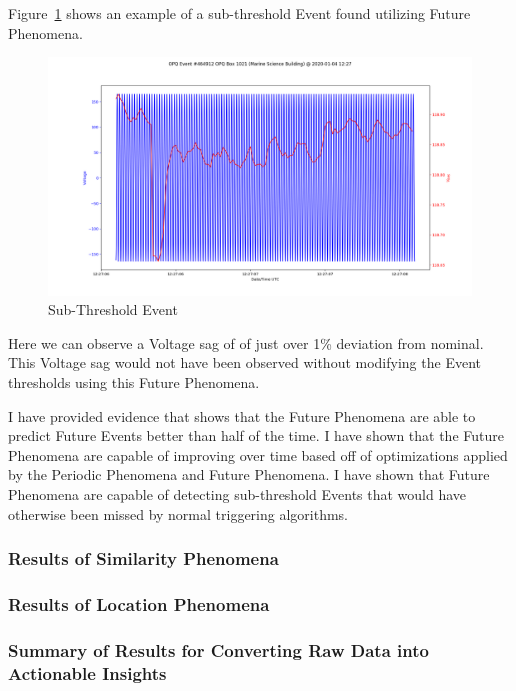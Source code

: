 Figure~\ref{fig:sub_thresh_event} shows an example of a sub-threshold Event found utilizing Future Phenomena.

\begin{figure}[h]
    \centering
    \includegraphics[width=\linewidth]{figures/event-single-464912.png}
    \caption{Sub-Threshold Event}
    \label{fig:sub_thresh_event}
\end{figure}

Here we can observe a Voltage sag of of just over 1\% deviation from nominal. This Voltage sag would not have been observed without modifying the Event thresholds using this Future Phenomena.

I have provided evidence that shows that the Future Phenomena are able to predict Future Events better than half of the time. I have shown that the Future Phenomena are capable of improving over time based off of optimizations applied by the Periodic Phenomena and Future Phenomena. I have shown that Future Phenomena are capable of detecting sub-threshold Events that would have otherwise been missed by normal triggering algorithms.

\subsubsection{Results of Similarity Phenomena}

\subsubsection{Results of Location Phenomena}

\subsubsection{Summary of Results for Converting Raw Data into Actionable Insights}

